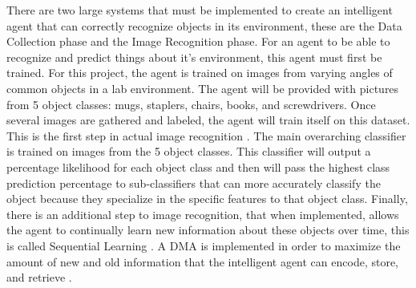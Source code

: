 \documentclass[draftclsnofoot, onecolumn, 10pt, compsoc]{IEEEtran}
\begin{document}
		There are two large systems that must be implemented to create an intelligent agent that can correctly recognize objects in its environment, these are the Data Collection phase and the Image Recognition phase. For an agent to be able to recognize and predict things about it's environment, this agent must first be trained. For this project, the agent is trained on images from varying angles of common objects in a lab environment. The agent will be provided with pictures from 5 object classes: mugs, staplers, chairs, books, and screwdrivers. Once several images are gathered and labeled, the agent will train itself on this dataset. This is the first step in actual image recognition \cite{ImgRecog}. The main overarching classifier is trained on images from the 5 object classes. This classifier will output a percentage likelihood for each object class and then will pass the highest class prediction percentage to sub-classifiers that can more accurately classify the object because they specialize in the specific features to that object class. Finally, there is an additional step to image recognition, that when implemented, allows the agent to continually learn new information about these objects over time, this is called Sequential Learning \cite{Kirkpatrick}. A DMA is implemented in order to maximize the amount of new and old information that the intelligent agent can encode, store, and retrieve \cite{McDermott}.
	
	
	
\end{document}
